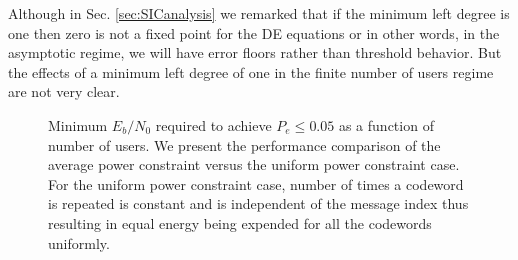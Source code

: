 \begin{remark}
\label{rmrk:mindegreeisone}
Although in Sec. \ref{sec:SICanalysis} we remarked that if the minimum left degree is one then zero is not a fixed point for the DE equations or in other words, in the asymptotic regime, we will have error floors rather than threshold behavior. But the effects of a minimum left degree of one in the finite number of users regime are not very clear. 
\end{remark}





\begin{figure}[h]
\centering
 \resizebox{0.75\textwidth}{!}{}
  \caption{Minimum $E_b/N_0$ required to achieve $P_e\leq 0.05$  as a function of number of users. We present the performance comparison of the average power constraint versus the uniform power constraint case. For the uniform power constraint case, number of times a codeword is repeated is constant and is independent of the message index thus resulting in equal energy being expended for all the codewords uniformly.}
  \label{fig:simulationresults30000}
\end{figure}


